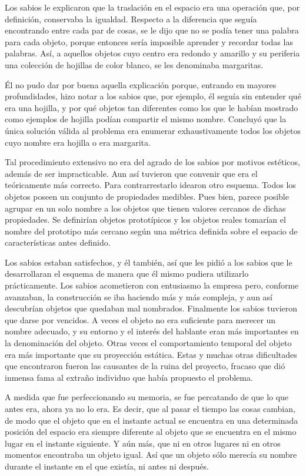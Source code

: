 Los sabios le explicaron que la traslación en el espacio era una operación
que, por definición, conservaba la igualdad. Respecto a la diferencia que
seguía encontrando entre cada par de cosas, se le dijo que no se podía tener
una palabra para cada objeto, porque entonces sería imposible aprender y
recordar todas las palabras. Así, a aquellos objetos cuyo centro era redondo
y amarillo y su periferia una colección de hojillas de color blanco, se les
denominaba margaritas.

Él no pudo dar por buena aquella explicación porque, entrando en mayores
profundidades, hizo notar a los sabios que, por ejemplo, él seguía sin
entender qué era una hojilla, y por qué objetos tan diferentes como los que
le habían mostrado como ejemplos de hojilla podían compartir el mismo
nombre. Concluyó que la única solución válida al problema era enumerar
exhaustivamente todos los objetos cuyo nombre era hojilla o era margarita.

Tal procedimiento extensivo no era del agrado de los sabios por motivos
estéticos, además de ser impracticable. Aun así tuvieron que convenir que
era el teóricamente más correcto. Para contrarrestarlo idearon otro esquema.
Todos los objetos poseen un conjunto de propiedades medibles. Pues bien,
parece posible agrupar en un solo nombre a los objetos que tienen valores
cercanos de dichas propiedades. Se definirían objetos prototípicos y los
objetos reales tomarían el nombre del prototipo más cercano según una
métrica definida sobre el espacio de características antes definido.

Los sabios estaban satisfechos, y él también, así que les pidió a los sabios
que le desarrollaran el esquema de manera que él mismo pudiera utilizarlo
prácticamente. Los sabios acometieron con entusiasmo la empresa pero,
conforme avanzaban, la construcción se iba haciendo más y más compleja, y
aun así descubrían objetos que quedaban mal nombrados. Finalmente los sabios
tuvieron que darse por vencidos. A veces el objeto no era suficiente para
merecer un nombre adecuado, y su entorno y el interés del hablante eran más
importantes en la denominación del objeto. Otras veces el comportamiento
temporal del objeto era más importante que su proyección estática. Estas y
muchas otras dificultades que encontraron fueron las causantes de la ruina
del proyecto, fracaso que dió inmensa fama al extraño individuo que había
propuesto el problema.

A medida que fue perfeccionando su memoria, se fue percatando de que lo que
antes era, ahora ya no lo era. Es decir, que al pasar el tiempo las cosas
cambian, de modo que el objeto que en el instante actual se encuentra en una
determinada posición del espacio era siempre diferente al objeto que se
encuentra en el mismo lugar en el instante siguiente. Y aún más, que ni en
otros lugares ni en otros momentos encontraba un objeto igual. Así que un
objeto sólo merecía su nombre durante el instante en el que existía, ni
antes ni después.

